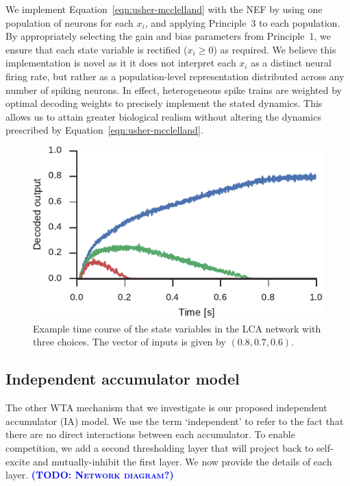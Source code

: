 \documentclass[10pt,letterpaper]{article}
\makeatletter
\newcommand{\todo}[1]{\textbf{\textsc{\textcolor{blue}{(TODO\@: #1)}}}}
\makeatother
\begin{document}
We implement Equation~\ref{eqn:usher-mcclelland} with the NEF by using one population of neurons for each $x_i$, and applying Principle~3 to each population.
By appropriately selecting the gain and bias parameters from Principle~1, we ensure that each state variable is rectified ($x_i \ge 0$) as required.
We believe this implementation is novel as it it does not interpret each $x_i$ as a distinct neural firing rate, but rather as a population-level representation distributed across any number of spiking neurons.
In effect, heterogeneous spike trains are weighted by optimal decoding weights to precisely implement the stated dynamics.
This allows us to attain greater biological realism without altering the dynamics prescribed by Equation~\ref{eqn:usher-mcclelland}.

\begin{figure}
    \centering
    \includegraphics{figures/usher-mcclelland}
    \caption{ \label{fig:usher-mcclelland}
        Example time course of the state variables in the LCA network with three choices.
        The vector of inputs is given by $(0.8, 0.7, 0.6)$.
    }
\end{figure}

\subsection{Independent accumulator model}
The other WTA mechanism that we investigate is our proposed independent accumulator (IA) model.
We use the term `independent' to refer to the fact that there are no direct interactions between each accumulator.
To enable competition, we add a second thresholding layer that will project back to self-excite and mutually-inhibit the first layer.
We now provide the details of each layer.
\todo{Network diagram?}
\end{document}
